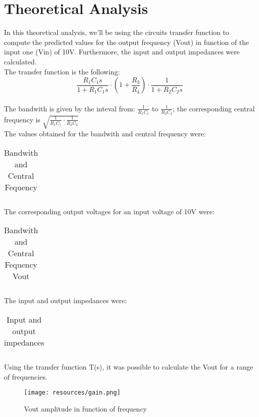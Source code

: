 \section{Theoretical Analysis}
\label{sec:analysis}

In this theoretical analysis, we'll be using the circuits transfer function to compute the predicted values for the output frequency (Vout) in function of the input one (Vin) of 10V. Furthermore, the input and output impedances were calculated.\\
The transfer function is the following: \[\frac{R_1C_1s}{1+R_1C_1s} \cdot (1+\frac{R_3}{R_4}) \cdot \frac{1}{1+R_2C_2s}\] \\
The bandwith is given by the inteval from: $\frac{1}{R_1C_1}$ to $\frac{1}{R_2C_2}$; the corresponding central frequency is $\sqrt{{\frac{1}{R_1C_1} \cdot \frac{1}{R_2C_2}}}$ \\
The values obtained for the bandwith and central frequency were:
\FloatBarrier
\begin{table}[h]
  \centering
  \begin{tabular}{|c|c|}
    \hline    
    
    \hline
  \end{tabular}
  \caption{Bandwith and Central Fequency}
  \label{tab:Octave_cent}
\end{table}
\FloatBarrier

The corresponding output voltages for an input voltage of 10V were:
\FloatBarrier
\begin{table}[h]
  \centering
  \begin{tabular}{|c|c|}
    \hline    
    
    \hline
  \end{tabular}
  \caption{Bandwith and Central Fequency Vout}
  \label{tab:Octave_cent}
\end{table}
\FloatBarrier

The input and output impedances were:
\FloatBarrier
\begin{table}[h]
  \centering
  \begin{tabular}{|c|c|}
    \hline    
    
    \hline
  \end{tabular}
  \caption{Input and output impedances}
  \label{tab:Octave_cent}
\end{table}
\FloatBarrier

Using the transfer function T(s), it was possible to calculate the Vout for a range of frequencies.

\begin{figure} [!htb] 
  \texttt{[image: resources/gain.png]}
  \caption{Vout amplitude in function of frequency} 
  \label{fig:theoplots}
  \endminipage\hfill
\end{figure}


